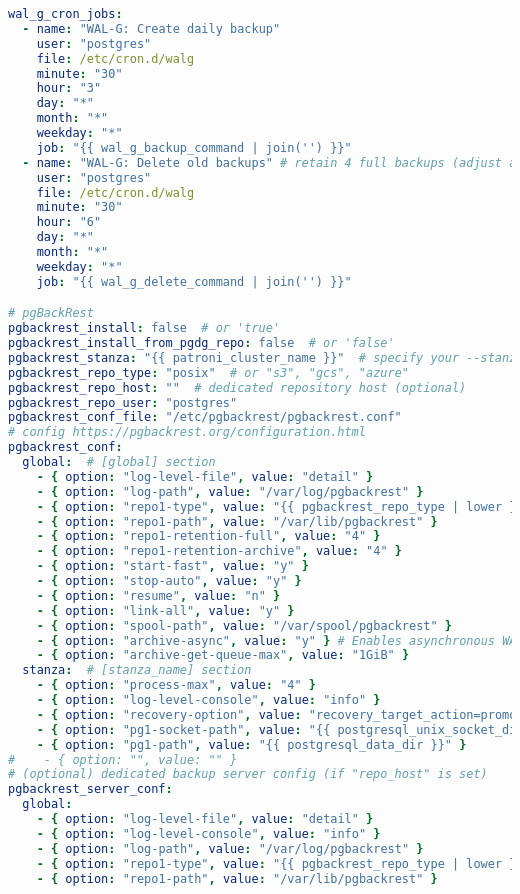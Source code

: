 \begin{flushleft}
\begin{lstlisting}[language=yaml, caption=Testsystem - Anhang - Maintenance - main.yml,captionpos=b,label={lst:testsystem-maintenance-main.yml},breaklines=true]
wal_g_cron_jobs:
  - name: "WAL-G: Create daily backup"
    user: "postgres"
    file: /etc/cron.d/walg
    minute: "30"
    hour: "3"
    day: "*"
    month: "*"
    weekday: "*"
    job: "{{ wal_g_backup_command | join('') }}"
  - name: "WAL-G: Delete old backups" # retain 4 full backups (adjust according to your company's backup retention policy)
    user: "postgres"
    file: /etc/cron.d/walg
    minute: "30"
    hour: "6"
    day: "*"
    month: "*"
    weekday: "*"
    job: "{{ wal_g_delete_command | join('') }}"

# pgBackRest
pgbackrest_install: false  # or 'true'
pgbackrest_install_from_pgdg_repo: false  # or 'false'
pgbackrest_stanza: "{{ patroni_cluster_name }}"  # specify your --stanza
pgbackrest_repo_type: "posix"  # or "s3", "gcs", "azure"
pgbackrest_repo_host: ""  # dedicated repository host (optional)
pgbackrest_repo_user: "postgres"
pgbackrest_conf_file: "/etc/pgbackrest/pgbackrest.conf"
# config https://pgbackrest.org/configuration.html
pgbackrest_conf:
  global:  # [global] section
    - { option: "log-level-file", value: "detail" }
    - { option: "log-path", value: "/var/log/pgbackrest" }
    - { option: "repo1-type", value: "{{ pgbackrest_repo_type | lower }}" }
    - { option: "repo1-path", value: "/var/lib/pgbackrest" }
    - { option: "repo1-retention-full", value: "4" }
    - { option: "repo1-retention-archive", value: "4" }
    - { option: "start-fast", value: "y" }
    - { option: "stop-auto", value: "y" }
    - { option: "resume", value: "n" }
    - { option: "link-all", value: "y" }
    - { option: "spool-path", value: "/var/spool/pgbackrest" }
    - { option: "archive-async", value: "y" } # Enables asynchronous WAL archiving (details: https://pgbackrest.org/user-guide.html#async-archiving)
    - { option: "archive-get-queue-max", value: "1GiB" }
  stanza:  # [stanza_name] section
    - { option: "process-max", value: "4" }
    - { option: "log-level-console", value: "info" }
    - { option: "recovery-option", value: "recovery_target_action=promote" }
    - { option: "pg1-socket-path", value: "{{ postgresql_unix_socket_dir }}" }
    - { option: "pg1-path", value: "{{ postgresql_data_dir }}" }
#    - { option: "", value: "" }
# (optional) dedicated backup server config (if "repo_host" is set)
pgbackrest_server_conf:
  global:
    - { option: "log-level-file", value: "detail" }
    - { option: "log-level-console", value: "info" }
    - { option: "log-path", value: "/var/log/pgbackrest" }
    - { option: "repo1-type", value: "{{ pgbackrest_repo_type | lower }}" }
    - { option: "repo1-path", value: "/var/lib/pgbackrest" }

\end{lstlisting}
\end{flushleft}
